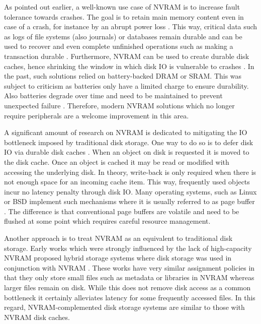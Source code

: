 As pointed out earlier, a well-known use case of NVRAM is to increase fault
tolerance towards crashes. The goal is to retain main memory content even in
case of a crash, for instance by an abrupt power loss \cite{molina1992main}.
This way, critical data such as logs of file systems (also journals) or
databases remain durable and can be used to recover and even complete unfinished
operations such as making a transaction durable \cite{liskov1991replication,
chen1996rio}. Furthermore, NVRAM can be used to create durable disk caches,
hence shrinking the window in which disk IO is vulnerable to crashes
\cite{chen1996rio, wu1994envy}. In the past, such solutions relied on
battery-backed DRAM or SRAM. This was subject to criticism as batteries only
have a limited charge to ensure durability. Also batteries degrade over time and
need to be maintained to prevent unexpected failure \cite{molina1992main}.
Therefore, modern NVRAM solutions which no longer require peripherals are a
welcome improvement in this area.

A significant amount of research on NVRAM is dedicated to mitigating the IO
bottleneck imposed by traditional disk storage. One way to do so is to defer
disk IO via durable disk caches \cite{chen1996rio, wu1994envy}. When an object
on disk is requested it is moved to the disk cache. Once an object is cached it
may be read or modified with accessing the underlying disk. In theory,
write-back is only required when there is not enough space for an incoming cache
item. This way, frequently used objects incur no latency penalty through disk
IO. Many operating systems, such as Linux or BSD implement such mechanisms where
it is usually referred to as page buffer . The difference is that
conventional page buffers are volatile and need to be flushed at some point
which requires careful resource management.

Another approach is to treat NVRAM as an equivalent to traditional disk storage.
Early works which were strongly influenced by the lack of high-capacity NVRAM
proposed hybrid storage systems where disk storage was used in conjunction with
NVRAM \cite{wang2002conquest, miller2001hermes}. These works have very similar
assignment policies in that they only store small files such as  metadata or
libraries in NVRAM whereas larger files remain on disk. While this does not
remove disk access as a common bottleneck it certainly alleviates latency for
some frequently accessed files. In this regard, NVRAM-complemented disk storage
systems are similar to those with NVRAM disk caches.

